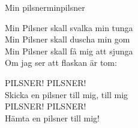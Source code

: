 \begin{song}{Min pilsner}{minpilsner}
\begin{vers}
Min Pilsner skall svalka min tunga\\
Min Pilsner skall duscha min gom\\
Min Pilsner skall få mig att sjunga\\
Om jag ser att flaskan är tom:\\
\end{vers}
\begin{vers}
PILSNER! PILSNER!\\
Skicka en pilsner till mig, till mig\\
PILSNER! PILSNER!\\
Hämta en pilsner till mig!\\
\end{vers}
\end{song}

